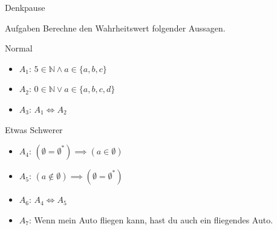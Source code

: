 {
\begin{frame}[fragile]{Denkpause}
    \begin{alertblock}{Aufgaben}
      Berechne den Wahrheitswert folgender Aussagen. 
    \end{alertblock}
    \begin{block}{Normal}
    \begin{itemize}
        \item $A_1$: $5 \in \mathbb{N} \wedge a \in \{a, b, c\}$
        \item $A_2$: $0 \in \mathbb{N} \vee a \in \{a, b, c, d\}$
        \item $A_3$: $A_1 \iff A_2$
    \end{itemize}
    \end{block}
    \begin{block}{Etwas Schwerer}
    \begin{itemize}
        \item $A_4$: $(\emptyset=\emptyset^{*}) \implies (a \in \emptyset)$
        \item $A_5$: $(a \notin \emptyset) \implies (\emptyset = \emptyset^{*})$
        \item $A_6$: $A_4 \iff A_5$
        \item $A_7$: Wenn mein Auto fliegen kann, hast du auch ein fliegendes Auto.
    \end{itemize}
    \end{block}
\end{frame}
}


